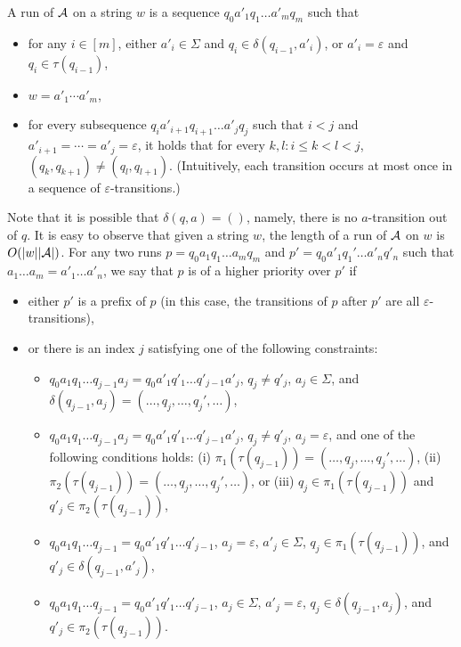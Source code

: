 A  run of $\mathcal{A}$ on a string $w$ is a sequence $q_0 a'_1 q_1 \ldots a'_m q_m$ such that 
\begin{itemize}
\item for any $i \in [m]$, either $a'_i \in \Sigma$ and $q_i \in \delta (q_{i - 1}, a'_i)$, or $a'_i = \varepsilon$ and $q_i \in \tau(q_{i-1})$, %
\item $w = a'_1 \cdots a'_m$,
%
\item for every subsequence $q_i a'_{i+1} q_{i+1} \ldots a'_{j} q_j$ such that  $i < j$ and $a'_{i+1} = \cdots = a'_j = \varepsilon$, it holds that for every $k, l: i \le k < l < j$, $(q_k, q_{k+1}) \neq (q_l, q_{l+1})$.
(Intuitively, each transition occurs at most once in a sequence of $\varepsilon$-transitions.) 
\end{itemize}
Note that it is possible that $\delta(q, a) = ()$, namely, there is no $a$-transition out of $q$. 
It is easy to observe that given a string $w$, the length of a run of $\mathcal{A}$ on $w$ is $O(|w||\mathcal{A}|)$. 
For any two runs $p = q_0 a_1 q_1 \ldots a_m q_m$ and $p' =  q_0 a'_1 q_1' \ldots a'_n q'_n$ such that $a_1 \ldots a_m = a'_1 \ldots a'_n$, we say that $p$ is of a higher priority over $p'$ if 
\begin{itemize}
\item either $p'$ is a prefix of $p$ (in this case, the transitions of $p$ after $p'$ are all $\varepsilon$-transitions), 
%
\item or there is an index $j$ satisfying one of the following constraints:
\begin{itemize}
\item $q_0 a_1 q_1 \ldots q_{j-1} a_j = q_0 a'_1 q'_1 \ldots q'_{j-1} a'_j$, $q_j \neq q'_j$, $a_j \in \Sigma$, and $\delta (q_{j - 1}, a_j) =(\ldots, q_j, \ldots, q_j', \ldots)$,
%
\item $q_0 a_1 q_1 \ldots q_{j-1} a_j = q_0 a'_1 q'_1 \ldots q'_{j-1} a'_j$, $q_j \neq q'_j$, $a_j  = \varepsilon$,  and one of the following conditions holds: (i) $\pi_1(\tau(q_{j - 1})) = (\ldots, q_j, \ldots, q_j', \ldots)$, (ii) $\pi_2(\tau(q_{j - 1})) = (\ldots, q_j, \ldots, q_j', \ldots)$, or (iii) $q_j \in \pi_1(\tau(q_{j - 1}))$ and $q'_j \in \pi_2(\tau(q_{j-1}))$, 
%
\item $q_0 a_1 q_1 \ldots q_{j-1}  = q_0 a'_1 q'_1 \ldots q'_{j-1} $, $a_j  = \varepsilon$, $a'_j  \in \Sigma$, $q_j \in \pi_1(\tau(q_{j - 1}))$, and $q'_j \in \delta(q_{j-1}, a'_j)$, 
%
\item $q_0 a_1 q_1 \ldots q_{j-1}  = q_0 a'_1 q'_1 \ldots q'_{j-1} $, $a_j  \in \Sigma$, $a'_j  = \varepsilon$, $q_j \in \delta(q_{j - 1}, a_j)$, and $q'_j \in \pi_2(\tau(q_{j-1}))$.
\end{itemize}
\end{itemize}
